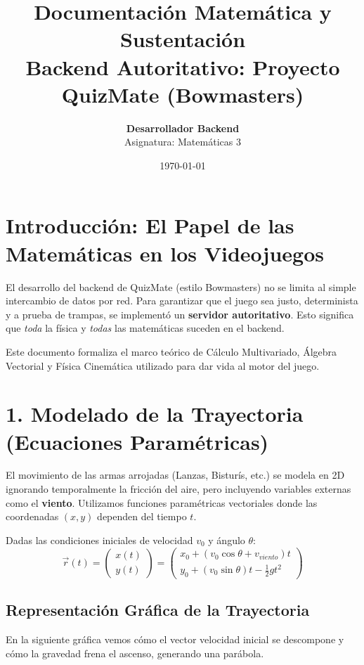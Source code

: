 \documentclass[12pt,a4paper]{article}
\title{\textbf{Documentación Matemática y Sustentación}\\ \Large Backend Autoritativo: Proyecto QuizMate (Bowmasters)}
\author{\textbf{Desarrollador Backend} \\ Asignatura: Matemáticas 3}
\date{\today}
\begin{document}
\maketitle
\tableofcontents
\newpage

\section{Introducción: El Papel de las Matemáticas en los Videojuegos}
El desarrollo del backend de QuizMate (estilo Bowmasters) no se limita al simple intercambio de datos por red. Para garantizar que el juego sea justo, determinista y a prueba de trampas, se implementó un \textbf{servidor autoritativo}. Esto significa que \textit{toda} la física y \textit{todas} las matemáticas suceden en el backend. 

Este documento formaliza el marco teórico de Cálculo Multivariado, Álgebra Vectorial y Física Cinemática utilizado para dar vida al motor del juego.

\section{1. Modelado de la Trayectoria (Ecuaciones Paramétricas)}
El movimiento de las armas arrojadas (Lanzas, Bisturís, etc.) se modela en 2D ignorando temporalmente la fricción del aire, pero incluyendo variables externas como el \textbf{viento}. Utilizamos funciones paramétricas vectoriales donde las coordenadas $(x, y)$ dependen del tiempo $t$.

Dadas las condiciones iniciales de velocidad $v_0$ y ángulo $\theta$:
\begin{equation}
\vec{r}(t) = \begin{pmatrix} x(t) \\ y(t) \end{pmatrix} = \begin{pmatrix} x_0 + (v_0 \cos \theta + v_{viento}) t \\ y_0 + (v_0 \sin \theta) t - \frac{1}{2} g t^2 \end{pmatrix}
\end{equation}

\subsection{Representación Gráfica de la Trayectoria}
En la siguiente gráfica vemos cómo el vector velocidad inicial se descompone y cómo la gravedad frena el ascenso, generando una parábola.
\end{document}
